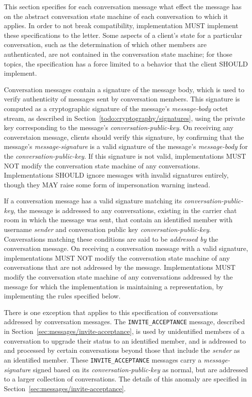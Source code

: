 \documentclass{article}
\def\message#1{\texttt{#1}}
\def\field#1{\textit{#1}}
\begin{document}
This section specifies for each conversation message what effect the message has on the abstract conversation state machine of each conversation to which it applies.
In order to not break compatibility, implementation MUST implement these specifications to the letter.
Some aspects of a client's state for a particular conversation, such as the determination of which other members are authenticated, are not contained in the conversation state machine; for those topics, the specification has a force limited to a behavior that the client SHOULD implement.

Conversation messages contain a signature of the message body, which is used to verify authenticity of messages sent by conversation members.
This signature is computed as a cryptographic signature of the message's \field{message-body} octet stream, as described in Section~\ref{todo:cryptography/signatures}, using the private key corresponding to the message's \field{conversation-public-key}.
On receiving any converstaion message, clients should verify this signature, by confirming that the message's \field{message-signature} is a valid signature of the message's \field{message-body} for the \field{conversation-public-key}.
If this signature is not valid, implementations MUST NOT modify the conversation state machine of any conversations.
Implementations SHOULD ignore messages with invalid signatures entirely, though they MAY raise some form of impersonation warning instead.

If a conversation message has a valid signature matching its \field{conversation-public-key}, the message is addressed to any conversations, existing in the carrier chat room in which the message was sent, that contain an identified member with username \field{sender} and conversation public key \field{conversation-public-key}.
Conversations matching these conditions are said to be \emph{addressed by} the conversation message.
On receiving a conversation message with a valid signature, implementations MUST NOT modify the conversation state machine of any conversations that are not addressed by the message.
Implementations MUST modify the conversation state machine of any conversations addressed by the message for which the implementation is maintaining a representation, by implementing the rules specified below.

There is one exception that applies to this specification of conversations addressed by conversation messages.
The \message{INVITE\_ACCEPTANCE} message, described in Section~\ref{sec:messages/invite-acceptance}, is used by unidentified members of a conversation to upgrade their status to an identified member, and is addressed to and processed by certain conversations beyond those that include the \field{sender} as an identified member.
These \message{INVITE\_ACCEPTANCE} messages carry a \field{message-signature} signed based on its \field{conversation-public-key} as normal, but are addressed to a larger collection of conversations.
The details of this anomaly are specified in Section~\ref{sec:messages/invite-acceptance}.
\end{document}
